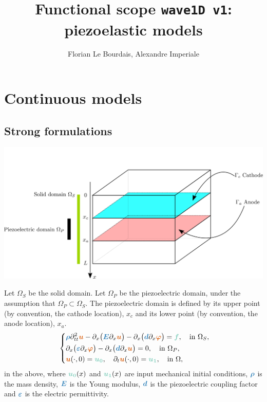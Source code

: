 \documentclass[11pt,a4paper]{article}
\title{Functional scope \texttt{wave1D v1}: piezoelastic models}
\author[1]{Florian Le Bourdais, Alexandre Imperiale}
\newcommand{\unknown}[1]{\bm{{\color{myred}{#1}}}}
\newcommand{\param}[1]{\bm{{\color{myhyperblue}{#1}}}}
\newcommand{\data}[1]{\bm{{\color{mygreen}{#1}}}}
\newcommand{\keyword}[1]{[\texttt{\textbf{#1}}]\!\,}
\begin{document}
% 

\maketitle

\section{Continuous models}
\subsection{Strong formulations}

\begin{center}
\includegraphics[scale=0.9]{figures/1dstack.png} 
\end{center}

Let $\Omega_S$ be the solid domain. Let $\Omega_P$ be the piezoelectric domain, under the assumption that  $\Omega_P \subset  \Omega_S$. The piezoelectric domain is defined by its upper point (by convention, the cathode location), $x_c$ and its lower point (by convention, the anode location), $x_a$.
\begin{equation*}
\keyword{PiezoElastic}~
\left\lbrace
\begin{aligned}
& \param{\rho}\partial^2_{tt} \unknown{u} - \partial_x\big( \param{E} \partial_x \unknown{u} \big) - \partial_x\big( \param{d} \partial_x \unknown{\varphi} \big) =  \data{f},\quad \text{in }\Omega_S,\\
& \partial_x\big( \param{\varepsilon} \partial_x \unknown{\varphi} \big) - \partial_x\big( \param{d} \partial_x \unknown{u} \big) =  0,\quad \text{in }\Omega_P,\\
& \unknown{u}(\cdot, 0) = \data{u_0},\quad \partial_t\unknown{u}(\cdot, 0) = \data{u_1},\quad \text{in }\Omega,
\end{aligned}
\right.
\end{equation*}
in the above, where $\data{u_0}(x)$ and $\data{u_1}(x)$ are input mechanical initial conditions, $\param{\rho}$ is the mass density, $\param{E}$ is the Young modulus, $\param{d}$ is the piezoelectric coupling factor and $\param{\varepsilon}$ is the electric permittivity.
\end{document}
